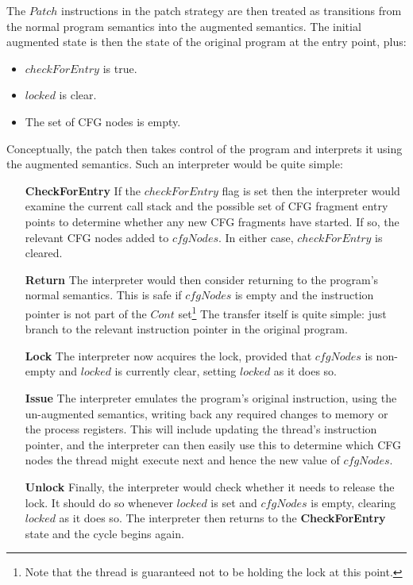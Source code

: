 The $Patch$ instructions in the patch strategy are then treated as
transitions from the normal program semantics into the augmented
semantics.  The initial augmented state is then the state of the
original program at the entry point, plus:

\begin{itemize}
\item $checkForEntry$ is true.
\item $locked$ is clear.
\item The set of CFG nodes is empty.
\end{itemize}

Conceptually, the patch then takes control of the program and
interprets it using the augmented semantics.  Such an interpreter
would be quite simple:

\begin{itemize}
\item[\textbf{CheckForEntry}] If the $checkForEntry$ flag is set then the
  interpreter would examine the current call stack and the possible
  set of CFG fragment entry points to determine whether any new CFG
  fragments have started.  If so, the relevant CFG nodes added to
  $cfgNodes$.  In either case, $checkForEntry$ is cleared.
\item[\textbf{Return}] The interpreter would then consider returning
  to the program's normal semantics.  This is safe if $cfgNodes$ is
  empty and the instruction pointer is not part of the $Cont$
  set\footnote{Note that the thread is guaranteed not to be holding
    the lock at this point.}  The transfer itself is quite simple:
  just branch to the relevant instruction pointer in the original
  program.
\item[\textbf{Lock}] The interpreter now acquires the lock, provided
  that $cfgNodes$ is non-empty and $locked$ is currently clear,
  setting $locked$ as it does so.
\item[\textbf{Issue}] The interpreter emulates the program's original
  instruction, using the un-augmented semantics, writing back any
  required changes to memory or the process registers.  This will
  include updating the thread's instruction pointer, and the
  interpreter can then easily use this to determine which CFG nodes
  the thread might execute next and hence the new value of $cfgNodes$.
\item[\textbf{Unlock}] Finally, the interpreter would check whether it
  needs to release the lock.  It should do so whenever $locked$ is set
  and $cfgNodes$ is empty, clearing $locked$ as it does so.  The
  interpreter then returns to the \textbf{CheckForEntry} state and the
  cycle begins again.
\end{itemize}
  
